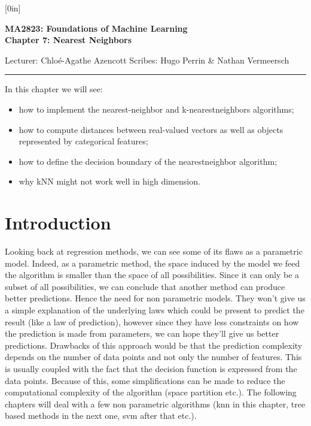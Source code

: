 \documentclass[a4paper,12pt]{article}
\begin{document}
\raisebox{0.6in}[0in]{}
\vspace{-0.7in}

\begin{center}
\bf\large MA2823: Foundations of Machine Learning \\
Chapter 7: Nearest Neighbors
\end{center}

\noindent
Lecturer: Chlo\'e-Agathe Azencott   
\hfill
Scribes: Hugo Perrin \& Nathan Vermeersch

\noindent
\rule{\textwidth}{1pt}

\medskip

In this chapter we will see:
\begin{itemize}
\item how to implement the nearest-neighbor and k-nearestneighbors algorithms;
\item how to compute distances between real-valued vectors as well as objects represented by categorical features;
\item how to define the decision boundary of the nearestneighbor algorithm;
\item why kNN might not work well in high dimension.
\end{itemize}

\section*{Introduction}

	Looking back at regression methods, we can see some of its flaws as a parametric model. Indeed, as a parametric method, the space induced by the model we feed the algorithm is smaller than the space of all possibilities. Since it can only be a subset of all possibilities, we can conclude that another method can produce better predictions. Hence the need for non parametric models. They won't give us a simple explanation of the underlying laws which could be present to predict the result (like a law of prediction), however since they have less constraints on how the prediction is made from parameters, we can hope they'll give us better predictions. Drawbacks of this approach would be that the prediction complexity depends on the number of data points and not only the number of features. This is usually coupled with the fact that the decision function is expressed from the data points. Because of this, some simplifications can be made to reduce the computational complexity of the algorithm (space partition etc.). The following chapters will deal with a few non parametric algorithms (knn in this chapter, tree based methods in the next one, svm after that etc.).
	
\end{document}
